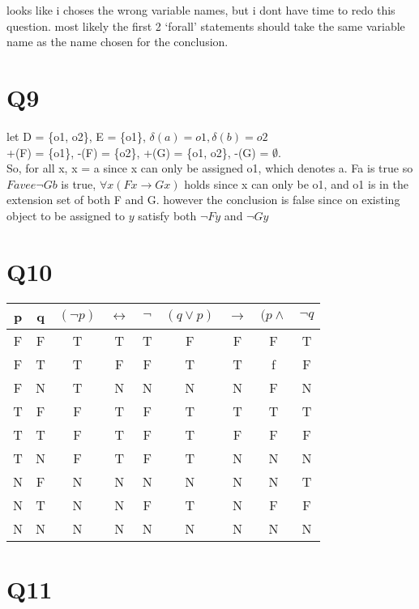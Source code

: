 \documentclass{article}
\begin{document}
looks like i choses the wrong variable names, but i dont have time to redo this question. most likely the first 2 
`forall' statements should take the same variable name as the name chosen for the conclusion.   


\section*{Q9}
let D = \{o1, o2\}, E = \{o1\}, $\delta(a) = o1, \delta(b) = o2$\\
+(F) = \{o1\}, -(F) = \{o2\}, +(G) = \{o1, o2\}, -(G) = $\emptyset$.\\

So, for all x, x = a since x can only be assigned o1, which denotes a. Fa is true so $Fa 
vee \lnot Gb$ is true, $\forall x (Fx \rightarrow Gx)$ holds since x can only be o1, and o1 is in the 
extension set of both F and G. however the conclusion is false since on existing object to be assigned to $y$ satisfy both 
$\lnot Fy$ and $\lnot Gy$

\section*{Q10}


\begin{tabular}{c c | c c c c c c c}
    p & q & $(\lnot p)$ & $\leftrightarrow$ & $\lnot$ & $(q \vee p)$ & $\rightarrow$ & $(p \wedge$ & $\lnot q$\\
    \hline
    F & F & T &       T & T & F & F & F & T\\
    F & T & T &       F & F & T & T & f & F\\
    F & N & T &       N & N & N & N & F & N\\
    T & F & F &       T & F & T & T & T & T\\
    T & T & F &       T & F & T & F & F & F\\
    T & N & F &       T & F & T & N & N & N\\
    N & F & N &       N & N & N & N & N & T\\
    N & T & N &       N & F & T & N & F & F\\
    N & N & N &       N & N & N & N & N & N\\

    
\end{tabular}


\section*{Q11}
\end{document}
